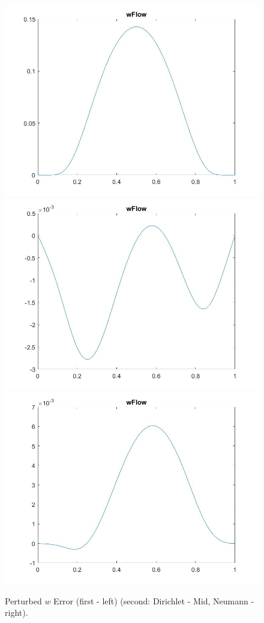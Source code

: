 \documentclass[11pt, a4paper]{article}
\theoremstyle{definition}
\begin{document}
\begin{figure}[h]
	\includegraphics[scale=0.2]{wFlint1.jpg}
	\includegraphics[scale=0.2]{wFlint2.jpg}
	\includegraphics[scale=0.2]{wFlint5.jpg}
	\caption{Perturbed $w$ Error (first - left) (second: Dirichlet - Mid, Neumann - right).}
	\label{Figlint2}
\end{figure}
\end{document}
